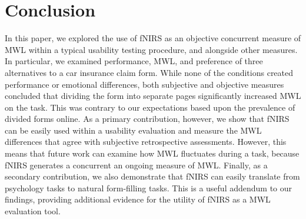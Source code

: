 \documentclass[../main/Replicate.tex]{subfiles}
\begin{document}
	\section{Conclusion}
	In this paper, we explored the use of fNIRS as an objective concurrent measure of MWL within a typical usability testing procedure, and alongside other measures. In particular, we examined performance, MWL, and preference of three alternatives to a car insurance claim form. %
	While none of the conditions created performance or emotional differences, both subjective and objective measures concluded that dividing the form into separate pages significantly increased MWL on the task. This was contrary to our expectations based upon the prevalence of divided forms online. As a primary contribution, however, we show that fNIRS can be easily used within a usability evaluation and measure the MWL differences that agree with subjective retrospective assessments. However, this means that future work can examine how MWL fluctuates during a task, because fNIRS generates a concurrent an ongoing measure of MWL. Finally, as a secondary contribution, we also demonstrate that fNIRS can easily translate from psychology tasks to natural form-filling tasks. This is a useful addendum to our findings, providing additional evidence for the utility of fNIRS as a MWL evaluation tool.
\end{document}
